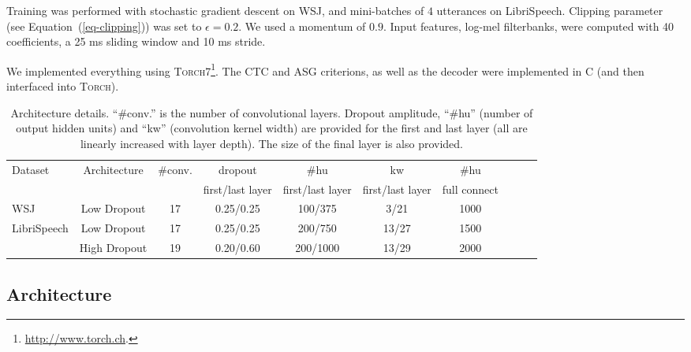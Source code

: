 \documentclass{article}
\begin{document}
Training was performed with stochastic gradient descent on WSJ, and
mini-batches of $4$ utterances on LibriSpeech. Clipping parameter (see
Equation~(\ref{eq-clipping})) was set to $\epsilon=0.2$. We used a momentum
of $0.9$. Input features, log-mel filterbanks, were computed with 40 coefficients,
a 25 ms sliding window and 10 ms stride.

We implemented everything using \textsc{\small
  Torch7}\footnote{\url{http://www.torch.ch}.}.
The CTC and ASG criterions, as well as the decoder were implemented in C
(and then interfaced into \textsc{\small Torch}).





\begin{table*}
\begin{center}
  \caption{
    Architecture details. ``\#conv.'' is the number of convolutional
    layers. Dropout amplitude, ``\#hu'' (number of output hidden units) and
    ``kw'' (convolution kernel width) are provided for the first and last
    layer (all are linearly increased with layer depth). The size of the final
    layer is also provided.}
    \label{tbl-arch}
      \small
      \setlength{\tabcolsep}{4.0pt}
      \begin{tabular}{lccccccccc}
        \toprule
        Dataset & Architecture & \#conv. & dropout & \#hu & kw & \#hu \\
        & & & {\footnotesize first/last layer} & {\footnotesize first/last layer} & {\footnotesize first/last layer} & {\footnotesize full connect} \\
        \midrule
        WSJ & Low Dropout  & 17 & 0.25/0.25 & 100/375  & 3/21 & 1000 \\
        \midrule
        LibriSpeech & Low Dropout  & 17 & 0.25/0.25 & 200/750  & 13/27 & 1500 \\
                    & High Dropout & 19 & 0.20/0.60 & 200/1000 & 13/29 & 2000 \\
        \bottomrule
      \end{tabular}
\end{center}
\end{table*}

\subsection{Architecture}
\label{sec-experiments-arch}
\end{document}

